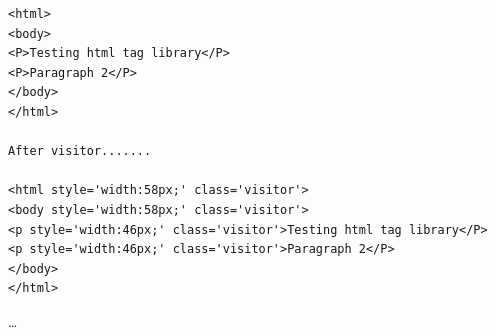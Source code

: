 \documentclass[12pt,a4paper,answers]{exam}
\begin{document}
\begin{questions}
\begin{Verbatim}
<html>
<body>
<P>Testing html tag library</P>
<P>Paragraph 2</P>
</body>
</html>

After visitor.......

<html style='width:58px;' class='visitor'>
<body style='width:58px;' class='visitor'>
<p style='width:46px;' class='visitor'>Testing html tag library</P>
<p style='width:46px;' class='visitor'>Paragraph 2</P>
</body>
</html>	
\end{Verbatim}

\begin{solution}
	\ldots
\end{solution}
\end{questions}
\end{document}
